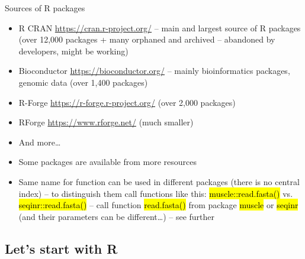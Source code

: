 \documentclass[compress, ucs, xelatex, 11pt, xcolor=svgnames,
  hyperref={
    bookmarks=true,
    unicode=true,
    colorlinks=true,
    pdftitle={Molecular data in R},
    plainpages=false,
    pdfauthor={Vojtech Zeisek},
    pdfsubject={Course about phylogeny and evolution in R},
    pdfcreator={XeLaTeX},
    pdfkeywords={R, evolution, phylogeny, molecular data},
    linkcolor=Tomato,
    anchorcolor=SaddleBrown,
    citecolor=Goldenrod,
    filecolor=DarkMagenta,
    menucolor=Sienna,
    urlcolor=DarkTurquoise,
    pdftex},
  url={hyphens, lowtilde} %
  ]{beamer}
\renewcommand{\texttt}[1]{\hl{\ttfamily #1}}
\begin{document}
\begin{frame}{Sources of R packages}
  \label{sources}
  \begin{itemize}
    \item R CRAN \url{https://cran.r-project.org/} -- main and largest source of R packages (over 12,000 packages + many orphaned and archived -- abandoned by developers, might be working)
    \item Bioconductor \url{https://bioconductor.org/} -- mainly bioinformatics packages, genomic data (over 1,400 packages)
    \item R-Forge \url{https://r-forge.r-project.org/} (over 2,000 packages)
    \item RForge \url{https://www.rforge.net/} (much smaller)
    \item And more\ldots
    \item Some packages are available from more resources
    \item Same name for function can be used in different packages (there is no central index) -- to distinguish them call functions like this: \texttt{muscle::read.fasta()} vs. \texttt{seqinr::read.fasta()} -- call function \texttt{read.fasta()} from package \texttt{muscle} \alert{or} \texttt{seqinr} (and their parameters can be different\ldots) -- see further
  \end{itemize}
\end{frame}

\subsection{Let's start with R}
\end{document}

